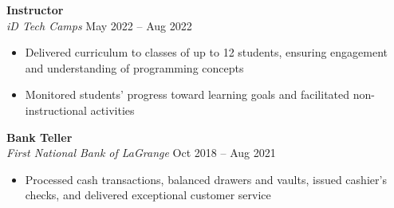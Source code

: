 \textbf{Instructor} \\
\textit{iD Tech Camps} \hfill May 2022 – Aug 2022
\begin{itemize}[itemsep=0.05em]
    \item Delivered curriculum to classes of up to 12 students, ensuring engagement and understanding of programming concepts
    \item Monitored students' progress toward learning goals and facilitated non-instructional activities
\end{itemize}
\textbf{Bank Teller} \\
\textit{First National Bank of LaGrange} \hfill Oct 2018 – Aug 2021
\begin{itemize}[itemsep=0.05em]
    \item Processed cash transactions, balanced drawers and vaults, issued cashier’s checks, and delivered exceptional customer service
\end{itemize}
